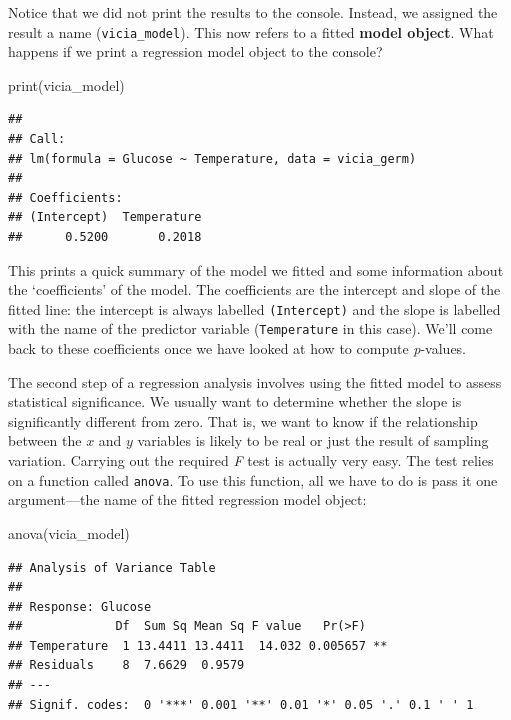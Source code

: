 \documentclass[
]{book}
\newenvironment{Shaded}{\begin{snugshade}}{\end{snugshade}}
\newcommand{\FunctionTok}[1]{\textcolor[rgb]{0.00,0.00,0.00}{#1}}
\newcommand{\NormalTok}[1]{#1}
\begin{document}
Notice that we did not print the results to the console. Instead, we assigned the result a name (\texttt{vicia\_model}). This now refers to a fitted \textbf{model object}. What happens if we print a regression model object to the console?

\begin{Shaded}
\begin{Highlighting}[]
\FunctionTok{print}\NormalTok{(vicia\_model)}
\end{Highlighting}
\end{Shaded}

\begin{verbatim}
## 
## Call:
## lm(formula = Glucose ~ Temperature, data = vicia_germ)
## 
## Coefficients:
## (Intercept)  Temperature  
##      0.5200       0.2018
\end{verbatim}

This prints a quick summary of the model we fitted and some information about the `coefficients' of the model. The coefficients are the intercept and slope of the fitted line: the intercept is always labelled \texttt{(Intercept)} and the slope is labelled with the name of the predictor variable (\texttt{Temperature} in this case). We'll come back to these coefficients once we have looked at how to compute \emph{p}-values.

The second step of a regression analysis involves using the fitted model to assess statistical significance. We usually want to determine whether the slope is significantly different from zero. That is, we want to know if the relationship between the \(x\) and \(y\) variables is likely to be real or just the result of sampling variation. Carrying out the required \emph{F} test is actually very easy. The test relies on a function called \texttt{anova}. To use this function, all we have to do is pass it one argument---the name of the fitted regression model object:

\begin{Shaded}
\begin{Highlighting}[]
\FunctionTok{anova}\NormalTok{(vicia\_model)}
\end{Highlighting}
\end{Shaded}

\begin{verbatim}
## Analysis of Variance Table
## 
## Response: Glucose
##             Df  Sum Sq Mean Sq F value   Pr(>F)   
## Temperature  1 13.4411 13.4411  14.032 0.005657 **
## Residuals    8  7.6629  0.9579                    
## ---
## Signif. codes:  0 '***' 0.001 '**' 0.01 '*' 0.05 '.' 0.1 ' ' 1
\end{verbatim}
\end{document}
